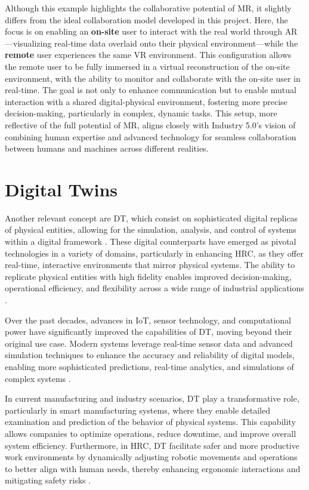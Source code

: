     Although this example highlights the collaborative potential of \ac{MR}, it slightly differs from the ideal collaboration model developed in this project. Here, the focus is on enabling an \textbf{on-site} user to interact with the real world through \ac{AR}—visualizing real-time data overlaid onto their physical environment—while the \textbf{remote} user experiences the same \ac{VR} environment. This configuration allows the remote user to be fully immersed in a virtual reconstruction of the on-site environment, with the ability to monitor and collaborate with the on-site user in real-time. The goal is not only to enhance communication but to enable mutual interaction with a shared digital-physical environment, fostering more precise decision-making, particularly in complex, dynamic tasks. This setup, more reflective of the full potential of \ac{MR}, aligns closely with Industry 5.0’s vision of combining human expertise and advanced technology for seamless collaboration between humans and machines across different realities.

\section{Digital Twins}
\label{sec:dt}
Another relevant concept are \ac{DT}, which consist on sophisticated digital replicas of physical entities, allowing for the simulation, analysis, and control of systems within a digital framework \cite{8361285}. These digital counterparts have emerged as pivotal technologies in a variety of domains, particularly in enhancing \ac{HRC}, as they offer real-time, interactive environments that mirror physical systems. The ability to replicate physical entities with high fidelity enables improved decision-making, operational efficiency, and flexibility across a wide range of industrial applications \cite{Baratta2024}.

Over the past decades, advances in \ac{IoT}, sensor technology, and computational power have significantly improved the capabilities of \ac{DT}, moving beyond their original use case. Modern systems leverage real-time sensor data and advanced simulation techniques to enhance the accuracy and reliability of digital models, enabling more sophisticated predictions, real-time analytics, and simulations of complex systems \cite{liu2022digitaltwin}.

In current manufacturing and industry scenarios, \ac{DT} play a transformative role, particularly in smart manufacturing systems, where they enable detailed examination and prediction of the behavior of physical systems. This capability allows companies to optimize operations, reduce downtime, and improve overall system efficiency. Furthermore, in \ac{HRC}, \ac{DT} facilitate safer and more productive work environments by dynamically adjusting robotic movements and operations to better align with human needs, thereby enhancing ergonomic interactions and mitigating safety risks \cite{8477101}.

